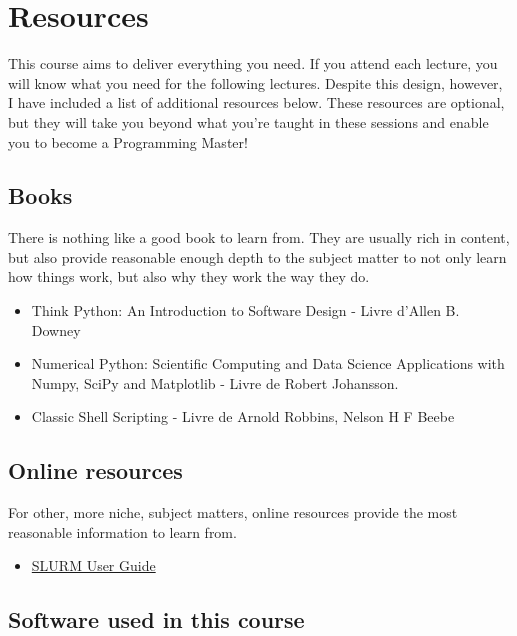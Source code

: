 \documentclass[11pt]{article}
\begin{document}
\section{Resources}
\label{sec:org70f37a3}

This course aims to deliver everything you need. If you attend each lecture, you will
know what you need for the following lectures. Despite this design, however, I have
included a list of additional resources below. These resources are optional, but they
will take you beyond what you're taught in these sessions and enable you to become a
Programming Master!

\subsection{Books}
\label{sec:org5735e00}

There is nothing like a good book to learn from. They are usually rich in content,
but also provide reasonable enough depth to the subject matter to not only learn how
things work, but also why they work the way they do.

\begin{itemize}
\item Think Python: An Introduction to Software Design - Livre d'Allen B. Downey
\item Numerical Python: Scientific Computing and Data Science Applications with Numpy,
SciPy and Matplotlib - Livre de Robert Johansson.
\item Classic Shell Scripting -  Livre de Arnold Robbins, Nelson H F Beebe
\end{itemize}

\subsection{Online resources}
\label{sec:org13eaaf4}

For other, more niche, subject matters, online resources provide the most reasonable
information to learn from.

\begin{itemize}
\item \href{https://slurm.schedmd.com/tutorials.html}{SLURM User Guide}
\end{itemize}

\subsection{Software used in this course}
\label{sec:org1a7cf01}
\end{document}
